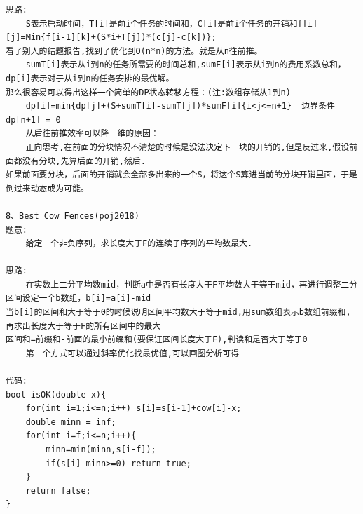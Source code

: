 \documentclass[twoside]{article}
\begin{document}
\begin{lstlisting}
思路:
    S表示启动时间，T[i]是前i个任务的时间和，C[i]是前i个任务的开销和f[i][j]=Min{f[i-1][k]+(S*i+T[j])*(c[j]-c[k])};
看了别人的结题报告,找到了优化到O(n*n)的方法。就是从n往前推。
    sumT[i]表示从i到n的任务所需要的时间总和,sumF[i]表示从i到n的费用系数总和，dp[i]表示对于从i到n的任务安排的最优解。
那么很容易可以得出这样一个简单的DP状态转移方程：(注:数组存储从1到n)
    dp[i]=min{dp[j]+(S+sumT[i]-sumT[j])*sumF[i]{i<j<=n+1}  边界条件 dp[n+1] = 0
    从后往前推效率可以降一维的原因：
    正向思考,在前面的分块情况不清楚的时候是没法决定下一块的开销的,但是反过来,假设前面都没有分块,先算后面的开销,然后.
如果前面要分块，后面的开销就会全部多出来的一个S，将这个S算进当前的分块开销里面，于是倒过来动态成为可能。

8、Best Cow Fences(poj2018)
题意:
    给定一个非负序列，求长度大于F的连续子序列的平均数最大.

思路:
    在实数上二分平均数mid，判断a中是否有长度大于F平均数大于等于mid，再进行调整二分区间设定一个b数组，b[i]=a[i]-mid
当b[i]的区间和大于等于0的时候说明区间平均数大于等于mid,用sum数组表示b数组前缀和,再求出长度大于等于F的所有区间中的最大
区间和=前缀和-前面的最小前缀和(要保证区间长度大于F),判读和是否大于等于0
    第二个方式可以通过斜率优化找最优值,可以画图分析可得

代码:
bool isOK(double x){
    for(int i=1;i<=n;i++) s[i]=s[i-1]+cow[i]-x;
    double minn = inf;
    for(int i=f;i<=n;i++){
        minn=min(minn,s[i-f]);
        if(s[i]-minn>=0) return true;
    }
    return false;
}\end{lstlisting}
\end{document}
